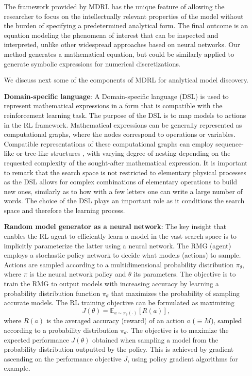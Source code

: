 \documentclass{article}
\begin{document}
The framework provided by MDRL has the unique feature of allowing the
researcher to focus on the intellectually relevant properties of the
model without the burden of specifying a predetermined analytical
form. The final outcome is an equation modeling the phenomena of
interest that can be inspected and interpreted, unlike other
widespread approaches based on neural networks. Our method generates a
mathematical equation, but could be similarly applied to generate
symbolic expressions for numerical discretizations.

We discuss next some of the components of MDRL for analytical model
discovery.

{\bf Domain-specific language}: A Domain-specific language (DSL) is
used to represent mathematical expressions in a form that is
compatible with the reinforcement learning task.  The purpose of the
DSL is to map models to actions in the RL framework.  Mathematical
expressions can be generally represented as computational graphs,
where the nodes correspond to operations or variables. Compatible
representations of these computational graphs can employ sequence-like
or tree-like structures \citep{bello2017neural, luo2018automatic,
  lample2019deep}, with varying degree of nesting depending on the
requested complexity of the sought-after mathematical expression.  It
is important to remark that the search space is not restricted to
elementary physical processes as the DSL allows for complex
combinations of elementary operations to build new ones, similarly as
to how with a few letters one can write a large number of words.  The
choice of the DSL plays an important role as it conditions the search
space and therefore the learning process.

{\bf Random model generator as a neural network}: The key insight that
enables the RL agent to efficiently learn a model in the vast search
space is to implicitly parameterize the latter using a neural
network. The RMG (agent) employs a stochastic policy network to decide
what models (actions) to sample. Actions are sampled according to a
multidimensional probability distribution $\pi_\theta$, where $\pi$ is
the neural network policy and $\theta$ its parameters. The objective
is to train the RMG to output models with increasing accuracy by
learning a probability distribution function $\pi_\theta$ that
maximizes the probability of sampling accurate models.
The RL training objective can be formulated as maximizing
\begin{equation}
J(\theta) = \mathbb{E}_{a\sim \pi_\theta (\cdot)}[R(a)],
\end{equation}
where $R(a)$ is the averaged accuracy (reward) of an action $a$ ($\equiv M$),
sampled according to a probability distribution $\pi_\theta$. The
objective is to maximize the expected performance $J(\theta)$ obtained
when sampling a model from the probability distribution outputted by
the policy. This is achieved by gradient ascending on the performance
objective $J$, using policy gradient algorithms for example.
\end{document}
